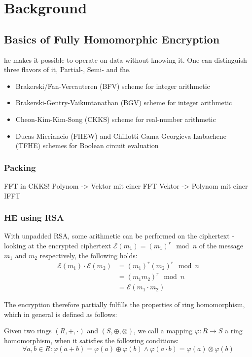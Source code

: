 \chapter{Background}
\label{chap:background}

\section{Basics of Fully Homomorphic Encryption}
\gls{he} makes it possible to operate on data without knowing it.
One can distinguish three flavors of it, Partial-, Semi- and \gls{fhe}.

\begin{itemize}
    \item Brakerski/Fan-Vercauteren (BFV) scheme for integer arithmetic
    \item Brakerski-Gentry-Vaikuntanathan (BGV) scheme for integer arithmetic
    \item Cheon-Kim-Kim-Song (CKKS) scheme for real-number arithmetic
    \item Ducas-Micciancio (FHEW) and Chillotti-Gama-Georgieva-Izabachene (TFHE) schemes for Boolean circuit evaluation
\end{itemize}

\subsection{Packing}
FFT in CKKS!
Polynom -> Vektor mit einer FFT
Vektor -> Polynom mit einer IFFT

\subsection{HE using RSA}
With unpadded RSA, some arithmetic can be performed on the ciphertext - looking at the encrypted ciphertext $\mathcal{E}(m_1) = (m_1)^r \mod n$ of the message $m_1$ and $m_2$ respectively, the following holds:
\begin{align}
    \mathcal{E}(m_1) \cdot \mathcal{E}(m_2)
    &= (m_1)^r (m_2)^r \mod n \\
    &= (m_1 m_2)^r \mod n \\
    &= \mathcal{E}(m_1 \cdot m_2)
\end{align}

The encryption therefore partially fulfills the properties of ring homomorphism, which in general is defined as follows:

\begin{definition}
    Given two rings $(R, +, \cdot)$ and $(S, \oplus, \otimes)$, we call a mapping $\varphi: R \rightarrow S$ a ring homomorphism, when it satisfies the following conditions:
    $$\forall a, b \in R: \varphi(a + b) = \varphi(a) \oplus \varphi(b) \wedge \varphi(a \cdot b) = \varphi(a) \otimes \varphi(b)$$
\end{definition}

